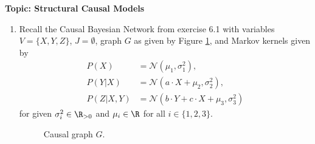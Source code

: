 

\flushleft\textbf{Topic: Structural Causal Models}

\begin{enumerate}[label=9.\arabic*]
    \item\label{ex:unfaithful_scm} Recall the Causal Bayesian Network from exercise 6.1 with variables $V=\{X, Y, Z\}$, $J=\emptyset$, graph $G$ as given by Figure \ref{fig:one}, and Markov kernels given by
    \begin{align*}
        P(X)      & = \mathcal{N}(\mu_1, \sigma^2_1),                      \\
        P(Y|X)    & = \mathcal{N}(a\cdot X + \mu_2, \sigma^2_2),           \\
        P(Z|X, Y) & = \mathcal{N}(b\cdot Y + c\cdot X + \mu_3, \sigma^2_3)
    \end{align*}
    for given $\sigma_i^2\in\R_{>0}$ and $\mu_i\in\R$ for all $i\in\{1, 2, 3\}$.

    \begin{figure}[ht]
        \centering
        \caption{Causal graph $G$.}
        \label{fig:one}
    \end{figure}


\end{enumerate}
